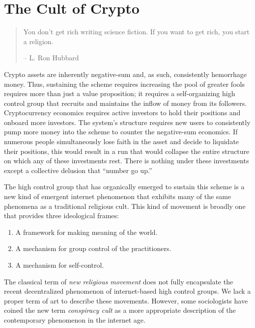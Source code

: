\chapter{The Cult of Crypto}

\begin{quote}
You don't get rich writing science fiction. If you want to get rich, you start a
religion.
\begin{flushright}
-- L. Ron Hubbard
\end{flushright}
\end{quote}


Crypto assets are inherently negative-sum and, as such, consistently hemorrhage
money. Thus, sustaining the scheme requires increasing the pool of greater fools
requires more than just a value proposition; it requires a self-organizing high
control group that recruits and maintains the inflow of money from its
followers. Cryptocurrency economics requires active investors to hold their
positions and onboard more investors. The system's structure requires new users
to consistently pump more money into the scheme to counter the negative-sum
economics. If numerous people simultaneously lose faith in the asset and decide
to liquidate their positions, this would result in a run that would collapse the
entire structure on which any of these investments rest. There is nothing under
these investments except a collective delusion that ``number go up.''

The high control group that has organically emerged to sustain this scheme is a
new kind of emergent internet phenomenon that exhibits many of the same
phenomena as a traditional religious cult. This kind of movement is broadly one
that provides three ideological frames:

\begin{enumerate}
  \item A framework for making meaning of the world.
  \item A mechanism for group control of the practitioners.
  \item A mechanism for self-control.
\end{enumerate}

The classical term of \textit{new religious movement} does not fully encapsulate
the recent decentralized phenomenon of internet-based high control groups. We
lack a proper term of art to describe these movements. However, some
sociologists have coined the new term \textit{conspiracy cult} as a more
appropriate description of the contemporary phenomenon in the internet age.

